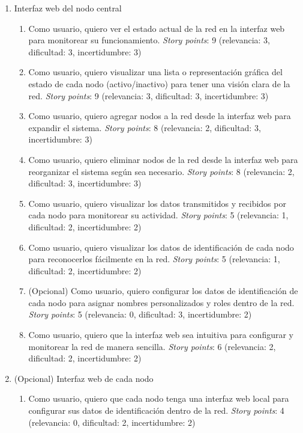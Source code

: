 \documentclass[
11pt, %
]{charter}
\begin{document}
\begin{enumerate}
\item Interfaz web del nodo central
\begin{enumerate}
	\item Como usuario, quiero ver el estado actual de la red en la interfaz web para monitorear su funcionamiento. \textit{Story points}: 9 (relevancia: 3, dificultad: 3, incertidumbre: 3)

	\item Como usuario, quiero visualizar una lista o representación gráfica del estado de cada nodo (activo/inactivo) para tener una visión clara de la red. \textit{Story points}: 9 (relevancia: 3, dificultad: 3, incertidumbre: 3)

	\item Como usuario, quiero agregar nodos a la red desde la interfaz web para expandir el sistema. \textit{Story points}: 8 (relevancia: 2, dificultad: 3, incertidumbre: 3)

	\item Como usuario, quiero eliminar nodos de la red desde la interfaz web para reorganizar el sistema según sea necesario. \textit{Story points}: 8 (relevancia: 2, dificultad: 3, incertidumbre: 3)

	\item Como usuario, quiero visualizar los datos transmitidos y recibidos por cada nodo para monitorear su actividad. \textit{Story points}: 5 (relevancia: 1, dificultad: 2, incertidumbre: 2)

	\item Como usuario, quiero visualizar los datos de identificación de cada nodo para reconocerlos fácilmente en la red. \textit{Story points}: 5 (relevancia: 1, dificultad: 2, incertidumbre: 2)

	\item (Opcional) Como usuario, quiero configurar los datos de identificación de cada nodo para asignar nombres personalizados y roles dentro de la red. \textit{Story points}: 5 (relevancia: 0, dificultad: 3, incertidumbre: 2)

	\item Como usuario, quiero que la interfaz web sea intuitiva para configurar y monitorear la red de manera sencilla. \textit{Story points}: 6 (relevancia: 2, dificultad: 2, incertidumbre: 2)

\end{enumerate}

\item (Opcional) Interfaz web de cada nodo
\begin{enumerate}
	\item Como usuario, quiero que cada nodo tenga una interfaz web local para configurar sus datos de identificación dentro de la red. \textit{Story points}: 4 (relevancia: 0, dificultad: 2, incertidumbre: 2)


\end{enumerate}
\end{enumerate}
\end{document}
